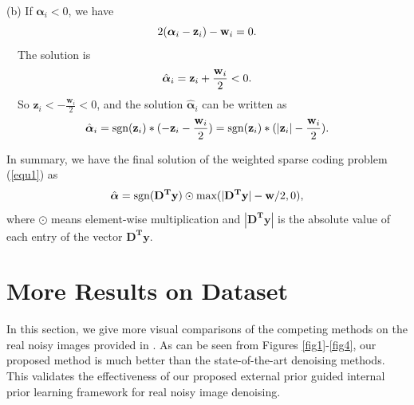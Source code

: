 \documentclass[10pt,onecolumn,letterpaper]{article}
\begin{document}
(b) If $\boldsymbol{\alpha}_{i}< 0$, we have
\begin{equation}\label{equ8}
\setlength{\abovedisplayskip}{0.1pt}
\setlength{\belowdisplayskip}{0.1pt}
2(\boldsymbol{\alpha}_{i}-\mathbf{z}_{i})-\mathbf{w}_{i}=0.
\end{equation}
\qquad\ \  The solution is
\begin{equation}\label{equ9}
\setlength{\abovedisplayskip}{0.1pt}
\setlength{\belowdisplayskip}{0.1pt}
\hat{\boldsymbol{\alpha}}_{i}=\mathbf{z}_{i}+\frac{\mathbf{w}_{i}}{2} < 0.
\end{equation}
\qquad\ \  So $\mathbf{z}_{i}<-\frac{\mathbf{w}_{i}}{2}< 0$, and the solution $\hat{\boldsymbol{\alpha}}_{i}$ can be written as
\begin{equation}\label{equ10}
\setlength{\abovedisplayskip}{1pt}
\setlength{\belowdisplayskip}{1pt}
\hat{\boldsymbol{\alpha}}_{i}=\text{sgn}(\mathbf{z}_{i})*(-\mathbf{z}_{i}-\frac{\mathbf{w}_{i}}{2})=\text{sgn}(\mathbf{z}_{i})*(|\mathbf{z}_{i}|-\frac{\mathbf{w}_{i}}{2}).
\end{equation} 

In summary, we have the final solution of the weighted sparse coding problem (\ref{equ1}) as
\begin{equation}\label{equ11}
\setlength{\abovedisplayskip}{3pt}
\setlength{\belowdisplayskip}{3pt}
\hat{\boldsymbol{\alpha}}= \text{sgn}(\mathbf{D^{T}y})\odot \text{max}(|\mathbf{D^{T}y}|-\mathbf{w}/2,0),
\end{equation}
where $\odot$ means element-wise multiplication and $|\mathbf{D^{T}y}|$ is the absolute value of each entry of the vector $\mathbf{D^{T}y}$.


\section{More Results on Dataset \cite{ncwebsite}}
In this section, we give more visual comparisons of the competing methods on the real noisy images provided in \cite{ncwebsite}. As can be seen from Figures \ref{fig1}-\ref{fig4}, our proposed method is much better than the state-of-the-art denoising methods. This validates the effectiveness of our proposed external prior guided internal prior learning framework for real noisy image denoising.
\end{document}
